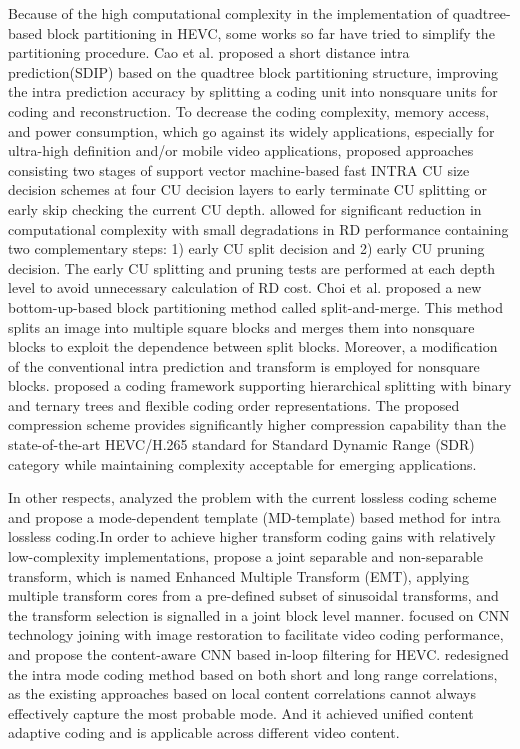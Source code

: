 \documentclass[journal]{IEEEtran}
\begin{document}
Because of the high computational complexity in the implementation of quadtree-based block partitioning in HEVC, some works so far have  tried  to  simplify the partitioning procedure. Cao et al. \cite{20} proposed a short distance intra prediction(SDIP) based on the quadtree block partitioning structure, improving the intra prediction accuracy by splitting a coding unit into nonsquare units for coding and reconstruction. To decrease the coding complexity, memory access, and power consumption, which go against its widely applications, especially for ultra-high definition and/or mobile video applications, \cite{21} proposed approaches consisting two stages of support vector machine-based fast INTRA CU size decision schemes at four CU decision layers to early terminate CU splitting or early skip checking the current CU depth. \cite{22} allowed for significant reduction in computational complexity with small degradations in RD performance containing two complementary steps: 1) early CU split decision and 2) early CU pruning decision. The early CU splitting and pruning tests  are  performed  at  each  depth level to avoid unnecessary calculation of RD cost. Choi et al. \cite{23} proposed a new bottom-up-based block partitioning method called split-and-merge. This method splits an image into multiple square blocks and merges them into nonsquare blocks to exploit the dependence between split blocks. Moreover, a modification of the conventional intra prediction and transform is employed for nonsquare blocks. \cite{24} proposed a coding framework supporting hierarchical splitting with binary and ternary trees and flexible coding order representations. The proposed compression scheme provides significantly higher compression capability than the state-of-the-art HEVC/H.265 standard for Standard Dynamic Range (SDR) category while maintaining complexity acceptable for emerging applications.

In other respects, \cite{25} analyzed the problem with the current lossless coding scheme and propose a mode-dependent template (MD-template) based method for intra lossless coding.In order to achieve  higher  transform  coding  gains  with  relatively low-complexity implementations, \cite{26} propose a joint separable and non-separable transform, which  is named Enhanced Multiple Transform (EMT), applying multiple transform cores from a pre-defined subset of sinusoidal transforms, and the transform selection is signalled in a joint block level manner. \cite{27} focused on CNN technology joining with image restoration to facilitate video
coding performance, and propose the content-aware CNN based in-loop filtering for HEVC. \cite{28} redesigned the intra mode coding method based on both short and long range correlations, as the existing approaches based on local content correlations cannot always effectively capture the most probable mode. And it achieved unified content adaptive coding and is applicable across different video content.
\end{document}
